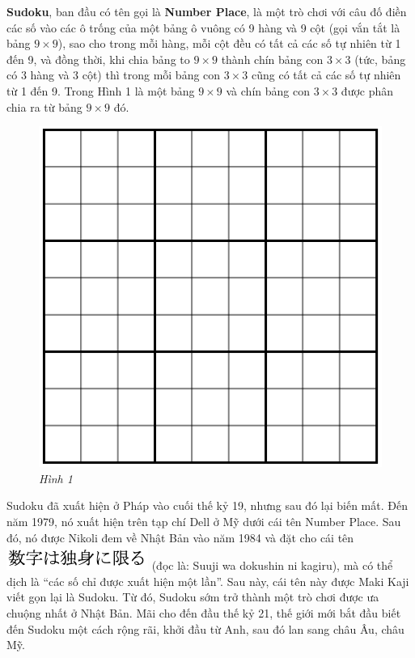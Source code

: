 	\begin{multicols}{2}
		\textbf{Sudoku}, ban đầu có tên gọi là \textbf{Number Place}, là một trò chơi với câu đố điền các số vào các ô trống của một bảng ô vuông có 9 hàng và 9 cột (gọi vắn tắt là bảng $9\times 9$), sao cho trong mỗi hàng, mỗi cột đều có tất cả các số tự nhiên từ 1 đến 9, và đồng thời, khi chia bảng to $9\times9$ thành chín bảng con $3\times 3$ (tức, bảng có 3 hàng và 3 cột) thì trong mỗi bảng con $3\times 3$ cũng có tất cả các số tự nhiên từ 1 đến 9. Trong Hình 1 là một bảng $9\times 9$ và chín bảng con $3\times 3$ được phân chia ra từ bảng $9\times 9$ đó.
		\begin{figure}[H]
			\vspace*{-5pt}
			\centering
			\captionsetup{labelformat=empty, justification=centering}
			\includegraphics[scale=0.35]{hinh1}
			\caption{\textit{\small Hình 1}}
			\vspace*{-5pt}
		\end{figure}
	\end{multicols}
	Sudoku đã xuất hiện ở Pháp vào cuối thế kỷ 19, nhưng sau đó lại biến mất. Đến năm 1979, nó xuất hiện trên tạp chí Dell ở Mỹ dưới cái tên Number Place. Sau đó, nó được Nikoli đem về Nhật Bản vào năm 1984 và đặt cho cái tên  \includegraphics[scale=0.4]{sudoku.png} (đọc là: Suuji wa dokushin ni kagiru), mà có thể dịch là “các số chỉ được xuất hiện một lần”. Sau này, cái tên này được Maki Kaji viết gọn lại là Sudoku. Từ đó, Sudoku sớm trở thành một trò chơi được ưa chuộng nhất ở Nhật Bản. Mãi cho đến đầu thế kỷ 21, thế giới mới bắt đầu biết đến Sudoku một cách rộng rãi, khởi đầu từ Anh, sau đó lan sang châu Âu, châu Mỹ.
